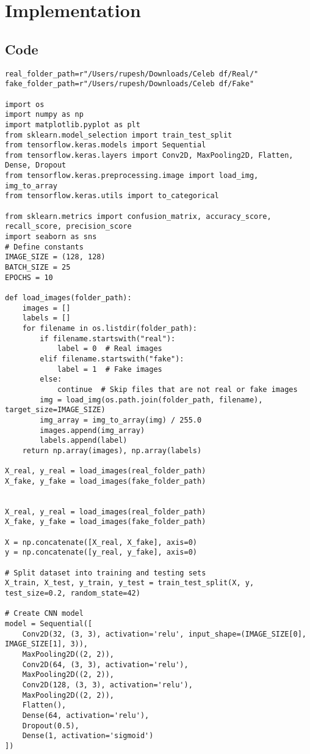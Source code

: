 \section{Implementation}

\subsection{Code}
\begin{verbatim}
real_folder_path=r"/Users/rupesh/Downloads/Celeb df/Real/"
fake_folder_path=r"/Users/rupesh/Downloads/Celeb df/Fake"

import os
import numpy as np
import matplotlib.pyplot as plt
from sklearn.model_selection import train_test_split
from tensorflow.keras.models import Sequential
from tensorflow.keras.layers import Conv2D, MaxPooling2D, Flatten, Dense, Dropout
from tensorflow.keras.preprocessing.image import load_img, img_to_array
from tensorflow.keras.utils import to_categorical

from sklearn.metrics import confusion_matrix, accuracy_score, recall_score, precision_score
import seaborn as sns
# Define constants
IMAGE_SIZE = (128, 128)
BATCH_SIZE = 25
EPOCHS = 10

def load_images(folder_path):
    images = []
    labels = []
    for filename in os.listdir(folder_path):
        if filename.startswith("real"):
            label = 0  # Real images
        elif filename.startswith("fake"):
            label = 1  # Fake images
        else:
            continue  # Skip files that are not real or fake images
        img = load_img(os.path.join(folder_path, filename), target_size=IMAGE_SIZE)
        img_array = img_to_array(img) / 255.0
        images.append(img_array)
        labels.append(label)
    return np.array(images), np.array(labels)

X_real, y_real = load_images(real_folder_path)
X_fake, y_fake = load_images(fake_folder_path)


X_real, y_real = load_images(real_folder_path)
X_fake, y_fake = load_images(fake_folder_path)

X = np.concatenate([X_real, X_fake], axis=0)
y = np.concatenate([y_real, y_fake], axis=0)

# Split dataset into training and testing sets
X_train, X_test, y_train, y_test = train_test_split(X, y, test_size=0.2, random_state=42)

# Create CNN model
model = Sequential([
    Conv2D(32, (3, 3), activation='relu', input_shape=(IMAGE_SIZE[0], IMAGE_SIZE[1], 3)),
    MaxPooling2D((2, 2)),
    Conv2D(64, (3, 3), activation='relu'),
    MaxPooling2D((2, 2)),
    Conv2D(128, (3, 3), activation='relu'),
    MaxPooling2D((2, 2)),
    Flatten(),
    Dense(64, activation='relu'),
    Dropout(0.5),
    Dense(1, activation='sigmoid')
])


\end{verbatim}
